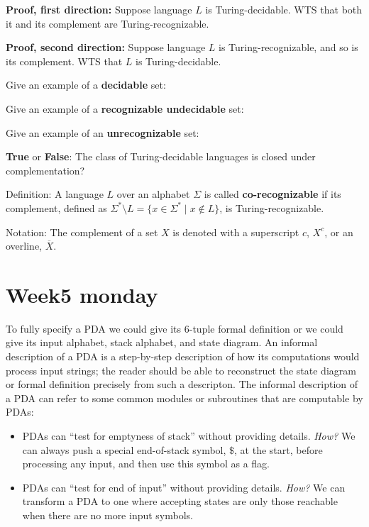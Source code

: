 \documentclass[12pt, oneside]{article}
\begin{document}
{\bf Proof, first direction:}  Suppose  language  $L$ is  Turing-decidable.   WTS  that both it and its complement 
are Turing-recognizable.

\vfill

{\bf Proof, second direction:}  Suppose  language  $L$ is  Turing-recognizable, and  so is  its complement.   WTS  that $L$
is Turing-decidable.
\vfill


Give an example of a {\bf decidable} set: 

\vspace{20pt}

Give an example of a {\bf recognizable undecidable} set: 

\vspace{20pt}

Give an example of an {\bf unrecognizable} set: 

\vspace{20pt}


\newpage

{\bf True} or {\bf False}: The class of Turing-decidable languages is closed under complementation?

\vfill
\vfill
\vfill
Definition: A language $L$ over an  alphabet $\Sigma$ is called {\bf co-recognizable} if its complement,  defined
as $\Sigma^* \setminus L  = \{ x  \in  \Sigma^* \mid x \notin  L \}$, is Turing-recognizable.


Notation: The complement  of a set $X$ is denoted with  a superscript $c$, $X^c$, or an overline,  $\overline{X}$.
 \vfill
\section*{Week5 monday}


To fully specify a PDA we could give its $6$-tuple formal definition or we could give its input 
alphabet, stack alphabet, and state diagram.
An informal description of a PDA is a step-by-step description of how its computations 
would process input strings; the reader should be able to reconstruct the state diagram or formal 
definition precisely from such a descripton. The informal description of a PDA can refer to some 
common modules or subroutines that are computable by PDAs:
\begin{itemize}
  \item PDAs can ``test for emptyness of stack'' without providing details. 
  {\it How?} We can always push a special end-of-stack symbol, $\$$, at the start, before processing
  any input, and then use this symbol as a flag.
  \item PDAs can ``test for end of input'' without providing details.
  {\it How?} We can transform a PDA to one where accepting states are only those reachable 
  when there are no more input symbols.
\end{itemize}
\end{document}

